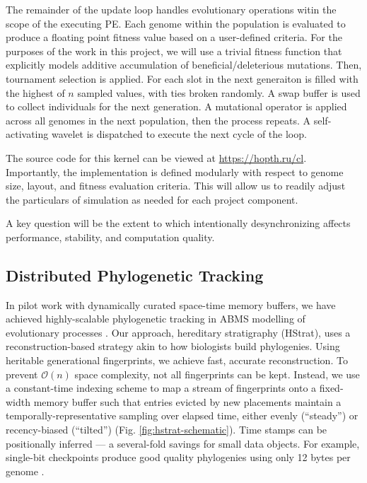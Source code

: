 The remainder of the update loop handles evolutionary operations witin the scope of the executing PE.
Each genome within the population is evaluated to produce a floating point fitness value based on a user-defined criteria.
For the purposes of the work in this project, we will use a trivial fitness function that explicitly models additive accumulation of beneficial/deleterious mutations.
Then, tournament selection is applied.
For each slot in the next generaiton is filled with the highest of $n$ sampled values, with ties broken randomly.
A swap buffer is used to collect individuals for the next generation.
A mutational operator is applied across all genomes in the next population, then the process repeats.
A self-activating wavelet is dispatched to execute the next cycle of the loop.

The source code for this kernel can be viewed at \url{https://hopth.ru/cl}.
Importantly, the implementation is defined modularly with respect to genome size, layout, and fitness evaluation criteria.
This will allow us to readily adjust the particulars of simulation as needed for each project component.

A key question will be the extent to which intentionally desynchronizing affects performance, stability, and computation quality.

\subsection{Distributed Phylogenetic Tracking}

In pilot work with dynamically curated space-time memory buffers, we have achieved highly-scalable phylogenetic tracking in ABMS modelling of evolutionary processes \citep{morenoHstratPythonPackage2022, morenoHereditaryStratigraphyGenome2022}.
Our approach, hereditary stratigraphy (HStrat), uses a reconstruction-based strategy akin to how biologists build phylogenies.
Using heritable generational fingerprints, we achieve fast, accurate reconstruction.
To prevent $\mathcal{O}(n)$ space complexity, not all fingerprints can be kept.
Instead, we use a constant-time indexing scheme to map a stream of fingerprints onto a fixed-width memory buffer such that entries evicted by new placements maintain a temporally-representative sampling over elapsed time, either evenly (``steady'') or recency-biased (``tilted'') (Fig. \ref{fig:hstrat-schematic}).
Time stamps can be positionally inferred  --- a several-fold savings for small data objects. For example, single-bit checkpoints produce good quality phylogenies using only 12 bytes per genome \citep{moreno2023toward}.


